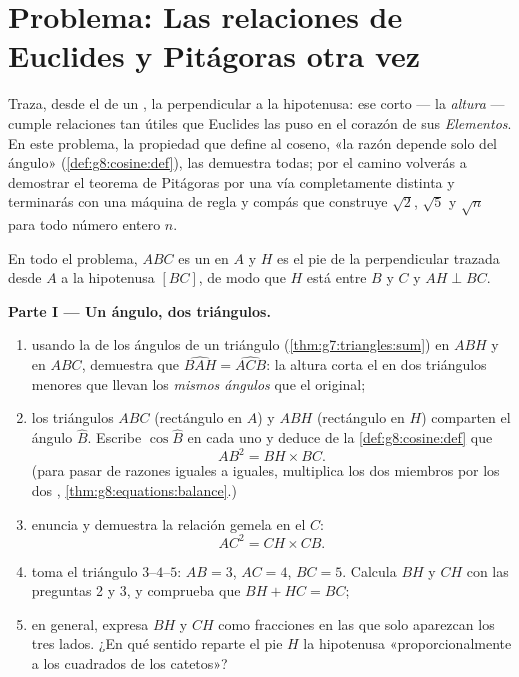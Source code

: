 \section{Problema: Las relaciones de Euclides y Pitágoras otra
vez}

\begin{problem}[{Problema de fin de semana --- la altura de un triángulo
rectángulo: $AB^2 = BH \times BC$, $AH^2 = BH \times HC$, una segunda
demostración de Pitágoras y una máquina para construir raíces cuadradas}]
\label{pb:g8:cosine:1}
Traza, desde el  de un , la perpendicular
a la hipotenusa: ese  corto --- la \emph{altura} ---
cumple relaciones tan útiles que Euclides las puso en el corazón de
sus \emph{Elementos}. En este problema, la propiedad que define al coseno,
«la razón depende solo del ángulo»
(\cref{def:g8:cosine:def}), las demuestra todas; por el camino
volverás a demostrar el teorema de Pitágoras por una vía completamente distinta
y terminarás con una máquina de regla y compás que construye
$\sqrt2$, $\sqrt5$ y $\sqrt{n}$ para todo número entero $n$.

En todo el problema, $ABC$ es un  en $A$ y $H$ es
el pie de la perpendicular trazada desde $A$ a la hipotenusa $[BC]$,
de modo que $H$ está entre $B$ y $C$ y $AH \perp BC$.

\medskip
\noindent\textbf{Parte I --- Un ángulo, dos triángulos.}
\begin{enumerate}
  \item usando la  de los ángulos de un triángulo
        (\cref{thm:g7:triangles:sum}) en $ABH$ y en $ABC$, demuestra
        que $\widehat{BAH} = \widehat{ACB}$: la altura corta
        el  en dos triángulos menores que llevan
        los \emph{mismos ángulos} que el original;
  \item los triángulos $ABC$ (rectángulo en $A$) y $ABH$
        (rectángulo en $H$) comparten el ángulo $\widehat B$. Escribe
        $\cos\widehat B$ en cada uno y deduce de la
        \cref{def:g8:cosine:def} que
        \[
        AB^2 = BH \times BC .
        \]
        (para pasar de razones iguales a  iguales, multiplica
        los dos miembros por los dos ,
        \cref{thm:g8:equations:balance}.)
  \item enuncia y demuestra la relación gemela en el  $C$:
        \[
        AC^2 = CH \times CB .
        \]
  \item toma el triángulo $3$--$4$--$5$: $AB = 3$, $AC = 4$,
        $BC = 5$. Calcula $BH$ y $CH$ con las preguntas 2 y 3,
        y comprueba que $BH + HC = BC$;
  \item en general, expresa $BH$ y $CH$ como fracciones en las que solo
        aparezcan los tres lados. ¿En qué sentido reparte el pie $H$
        la hipotenusa «proporcionalmente a los cuadrados de
        los catetos»?
\end{enumerate}


\end{problem}
